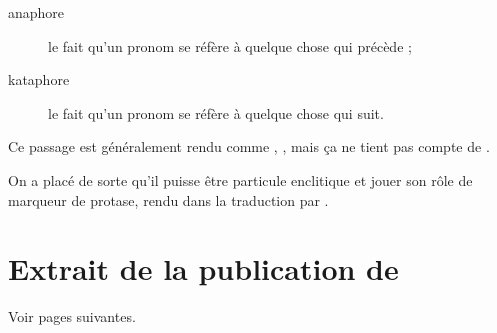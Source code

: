 \documentclass[%
  ngerman, %
  dvipsnames, %
  svgnames, %
  a4paper, %
  twoside, %
  10pt, %
  openany, %
  article, %
]{memoir}
\begin{document}
\begin{hierobox}[breakable]



  \tcblower

  \begin{description}
    \item [anaphore] le fait qu'un pronom se réfère à quelque chose 
          qui précède ;
    \item [kataphore] le fait qu'un pronom se réfère à quelque chose 
          qui suit.
  \end{description}

  Ce passage est généralement rendu comme , , mais ça ne tient pas compte de 
  .

  On a placé  de sorte qu'il puisse être particule enclitique 
  et jouer son rôle de marqueur de protase, rendu dans la traduction 
  par .
\end{hierobox}

\begin{hierobox}

  \tg{}

  \td{}%
\end{hierobox}


\appendix
\appendixpage*

\chapter[Extrait de la publication de \bsc{Helck}]
        {Extrait de la publication de  \autocite{Helck}}
\label{sec:pdf}

Voir pages suivantes.

\end{document}
